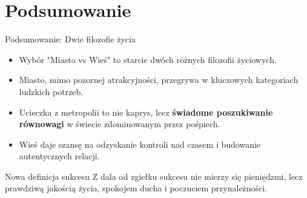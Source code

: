 \section{Podsumowanie}
\begin{frame}{Podsumowanie: Dwie filozofie życia}
    \begin{itemize}
        \item Wybór "Miasto vs Wieś" to starcie dwóch różnych filozofii życiowych.
        \item Miasto, mimo pozornej atrakcyjności, przegrywa w kluczowych kategoriach ludzkich potrzeb.
        \item Ucieczka z metropolii to nie kaprys, lecz \textbf{świadome poszukiwanie równowagi} w świecie zdominowanym przez pośpiech.
        \item Wieś daje szansę na odzyskanie kontroli nad czasem i budowanie autentycznych relacji.
    \end{itemize}

    \vspace{0.3cm}

    \begin{alertblock}{Nowa definicja sukcesu}
        Z dala od zgiełku sukcesu nie mierzy się pieniędzmi, lecz prawdziwą jakością życia, spokojem ducha i poczuciem przynależności.
    \end{alertblock}
\end{frame}